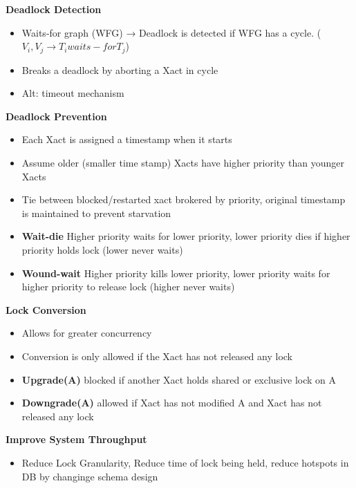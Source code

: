 \documentclass[10pt, landscape]{article}
\begin{document}
\begin{multicols}{4}
\textbf{Deadlock Detection} \\
\begin{itemize}
  \item Waits-for graph (WFG) → Deadlock is detected if WFG has a cycle. ($V_i, V_j \rightarrow T_i waits-for T_j$)
  \item Breaks a deadlock by aborting a Xact in cycle
  \item Alt: timeout mechanism 
\end{itemize}

\textbf{Deadlock Prevention} \\
\begin{itemize}
  \item Each Xact is assigned a timestamp when it starts
  \item Assume older (smaller time stamp) Xacts have higher priority than younger Xacts
  \item Tie between blocked/restarted xact brokered by priority, original timestamp is maintained to prevent starvation
  \item \textbf{Wait-die} Higher priority waits for lower priority, lower priority dies if higher priority holds lock (lower never waits)
  \item \textbf{Wound-wait} Higher priority kills lower priority, lower priority waits for higher priority to release lock (higher never waits)
\end{itemize}


\textbf{Lock Conversion} \\
\begin{itemize}
  \item Allows for greater concurrency 
  \item Conversion is only allowed if the Xact has not released any lock 
  \item \textbf{Upgrade(A)} blocked if another Xact holds shared or exclusive lock on A
  \item \textbf{Downgrade(A)} allowed if Xact has not modified A and Xact has not released any lock
\end{itemize}

\textbf{Improve System Throughput} \\
\begin{itemize}
  \item Reduce Lock Granularity, Reduce time of lock being held, reduce hotspots in DB by changinge schema design
\end{itemize}


\end{multicols}
\end{document}
